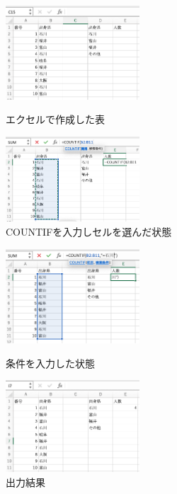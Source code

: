 \begin{figure}[htbp]
    \begin{minipage}{0.5\hsize}
        \centering
        \includegraphics[width=5cm]{chap1/countif.png}
        \caption{エクセルで作成した表}
        \label{fig:countif}
    \end{minipage}
    \begin{minipage}{0.5\hsize}
        \centering
        \includegraphics[width=5cm]{chap1/select_cells_countif.png}
        \caption{COUNTIFを入力しセルを選んだ状態}
        \label{fig:select_cells_countif}
    \end{minipage}
\end{figure}

\begin{figure}[htbp]
    \begin{minipage}{0.5\hsize}
        \centering
        \includegraphics[width=5cm]{chap1/operator_countif.png}
        \caption{条件を入力した状態}
        \label{fig:operator_countif}
    \end{minipage}
    \begin{minipage}{0.5\hsize}
        \centering
        \includegraphics[width=5cm]{chap1/result_countif.png}
        \caption{出力結果}
        \label{fig:result_countif}
    \end{minipage}
\end{figure}

